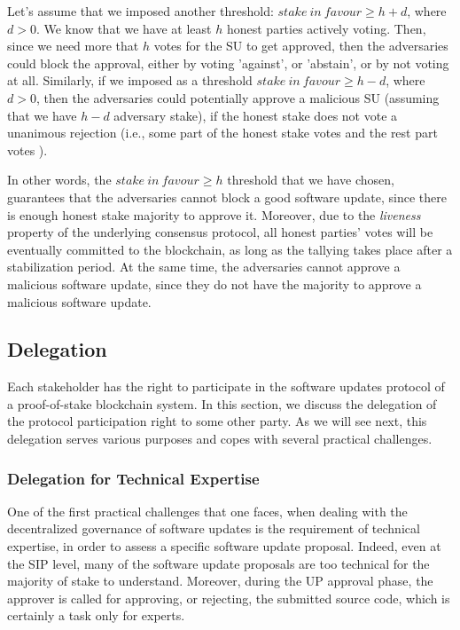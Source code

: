 Let's assume that we imposed another threshold: 
$stake\ in\ favour \geq h + d$, where $d > 0$. We know that we have at least $h$ honest parties actively voting. Then, since we need more that $h$ votes for the SU to get approved, then the adversaries could block the approval, either by voting 'against', or 'abstain', or by not voting at all.
Similarly, if we imposed as a threshold $stake\ in\ favour \geq h - d$, where $d > 0$, then the adversaries could potentially approve a malicious SU (assuming that we have $h-d$ adversary stake), if the honest stake does not vote a unanimous rejection (i.e., some part of the honest stake votes  and the rest part votes ). 

In other words, the  $stake\ in\ favour \geq h$ threshold that we have chosen, guarantees that the adversaries cannot block a good software update, since there is enough honest stake majority to approve it. Moreover, due to the \emph{liveness} property of the underlying consensus protocol, all honest parties' votes will be eventually committed to the blockchain, as long as the tallying takes place after a stabilization period. At the same time, the adversaries cannot approve a malicious software update, since they do not have the majority to approve a malicious software update.

\subsection{Delegation} \label{appxdelegation}
Each stakeholder has the right to participate in the software updates protocol of a proof-of-stake blockchain system.
In this section, we discuss the delegation of the protocol participation right to some other party. As we will see next, this delegation serves various purposes and copes with several practical challenges.
\subsubsection{Delegation for Technical Expertise}\label{delfortech}
One of the first practical challenges that one faces, when dealing with the decentralized governance of software updates is the requirement of technical expertise, in order to assess a specific software update proposal. Indeed, even at the SIP level, many of the software update proposals are too technical for the majority of stake to understand. Moreover, during the UP approval phase, the approver is called for approving, or rejecting, the submitted source code, which is certainly a task only for experts.

